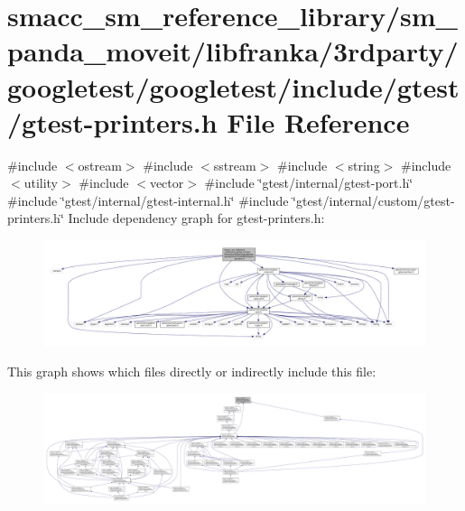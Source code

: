 \hypertarget{gtest-printers_8h}{}\section{smacc\+\_\+sm\+\_\+reference\+\_\+library/sm\+\_\+panda\+\_\+moveit/libfranka/3rdparty/googletest/googletest/include/gtest/gtest-\/printers.h File Reference}
\label{gtest-printers_8h}
{\ttfamily \#include $<$ostream$>$}\newline
{\ttfamily \#include $<$sstream$>$}\newline
{\ttfamily \#include $<$string$>$}\newline
{\ttfamily \#include $<$utility$>$}\newline
{\ttfamily \#include $<$vector$>$}\newline
{\ttfamily \#include \char`\"{}gtest/internal/gtest-\/port.\+h\char`\"{}}\newline
{\ttfamily \#include \char`\"{}gtest/internal/gtest-\/internal.\+h\char`\"{}}\newline
{\ttfamily \#include \char`\"{}gtest/internal/custom/gtest-\/printers.\+h\char`\"{}}\newline
Include dependency graph for gtest-\/printers.h\+:
\nopagebreak
\begin{figure}[H]
\begin{center}
\leavevmode
\includegraphics[width=350pt]{gtest-printers_8h__incl}
\end{center}
\end{figure}
This graph shows which files directly or indirectly include this file\+:
\nopagebreak
\begin{figure}[H]
\begin{center}
\leavevmode
\includegraphics[width=350pt]{gtest-printers_8h__dep__incl}
\end{center}
\end{figure}
